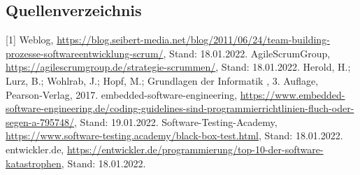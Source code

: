 \documentclass[12pt]{scrartcl}
\begin{document}
\newpage

\subsection{Quellenverzeichnis}

[1] Weblog, \url{https://blog.seibert-media.net/blog/2011/06/24/team-building-prozesse-softwareentwicklung-scrum/}, Stand: 18.01.2022.
\newline
[2] AgileScrumGroup, \url{https://agilescrumgroup.de/strategie-scrummen/}, Stand: 18.01.2022.
\newline
[3] Herold, H.; Lurz, B.; Wohlrab, J.; Hopf, M.; \glqq Grundlagen der Informatik \grqq , 3. Auflage, Pearson-Verlag, 2017.
\newline
[4] embedded-software-engineering, \url{https://www.embedded-software-engineering.de/coding-guidelines-sind-programmierrichtlinien-fluch-oder-segen-a-795748/}, Stand: 19.01.2022.
\newline
[5] Software-Testing-Academy, \url{https://www.software-testing.academy/black-box-test.html}, Stand: 18.01.2022.
\newline
[6] entwickler.de, \url{https://entwickler.de/programmierung/top-10-der-software-katastrophen}, Stand: 18.01.2022. 
 
\end{document}
